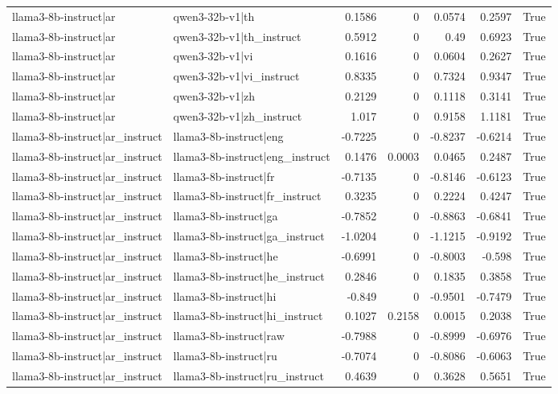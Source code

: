 \begin{table}
\begin{tabular}{l l r r r r l}
llama3-8b-instruct|ar & qwen3-32b-v1|th & 0.1586 & 0 & 0.0574 & 0.2597 & True \\
llama3-8b-instruct|ar & qwen3-32b-v1|th_instruct & 0.5912 & 0 & 0.49 & 0.6923 & True \\
llama3-8b-instruct|ar & qwen3-32b-v1|vi & 0.1616 & 0 & 0.0604 & 0.2627 & True \\
llama3-8b-instruct|ar & qwen3-32b-v1|vi_instruct & 0.8335 & 0 & 0.7324 & 0.9347 & True \\
llama3-8b-instruct|ar & qwen3-32b-v1|zh & 0.2129 & 0 & 0.1118 & 0.3141 & True \\
llama3-8b-instruct|ar & qwen3-32b-v1|zh_instruct & 1.017 & 0 & 0.9158 & 1.1181 & True \\
llama3-8b-instruct|ar_instruct & llama3-8b-instruct|eng & -0.7225 & 0 & -0.8237 & -0.6214 & True \\
llama3-8b-instruct|ar_instruct & llama3-8b-instruct|eng_instruct & 0.1476 & 0.0003 & 0.0465 & 0.2487 & True \\
llama3-8b-instruct|ar_instruct & llama3-8b-instruct|fr & -0.7135 & 0 & -0.8146 & -0.6123 & True \\
llama3-8b-instruct|ar_instruct & llama3-8b-instruct|fr_instruct & 0.3235 & 0 & 0.2224 & 0.4247 & True \\
llama3-8b-instruct|ar_instruct & llama3-8b-instruct|ga & -0.7852 & 0 & -0.8863 & -0.6841 & True \\
llama3-8b-instruct|ar_instruct & llama3-8b-instruct|ga_instruct & -1.0204 & 0 & -1.1215 & -0.9192 & True \\
llama3-8b-instruct|ar_instruct & llama3-8b-instruct|he & -0.6991 & 0 & -0.8003 & -0.598 & True \\
llama3-8b-instruct|ar_instruct & llama3-8b-instruct|he_instruct & 0.2846 & 0 & 0.1835 & 0.3858 & True \\
llama3-8b-instruct|ar_instruct & llama3-8b-instruct|hi & -0.849 & 0 & -0.9501 & -0.7479 & True \\
llama3-8b-instruct|ar_instruct & llama3-8b-instruct|hi_instruct & 0.1027 & 0.2158 & 0.0015 & 0.2038 & True \\
llama3-8b-instruct|ar_instruct & llama3-8b-instruct|raw & -0.7988 & 0 & -0.8999 & -0.6976 & True \\
llama3-8b-instruct|ar_instruct & llama3-8b-instruct|ru & -0.7074 & 0 & -0.8086 & -0.6063 & True \\
llama3-8b-instruct|ar_instruct & llama3-8b-instruct|ru_instruct & 0.4639 & 0 & 0.3628 & 0.5651 & True \\

\end{tabular}
\end{table}
